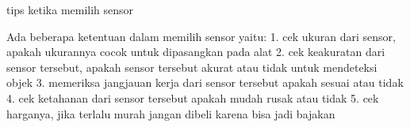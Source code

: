 tips ketika memilih sensor

Ada beberapa ketentuan dalam memilih sensor yaitu:
1. cek ukuran dari sensor, apakah ukurannya cocok untuk dipasangkan pada alat
2. cek keakuratan dari sensor tersebut, apakah sensor tersebut akurat atau tidak untuk mendeteksi objek
3. memeriksa jangjauan kerja dari sensor tersebut apakah sesuai atau tidak
4. cek ketahanan dari sensor tersebut apakah mudah rusak atau tidak
5. cek harganya, jika terlalu murah jangan dibeli karena bisa jadi bajakan